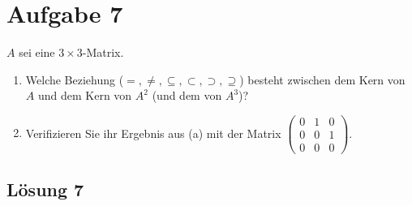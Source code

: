 \documentclass[main.tex]{subfiles}
\begin{document}
\section{Aufgabe 7}
$A$ sei eine $3 \times 3$-Matrix.
\begin{enumerate}
    \item Welche Beziehung ($=,\neq, \subseteq, \subset, \supset, \supseteq$) besteht zwischen dem Kern von $A$ und dem Kern von $A^2$ (und dem von $A^3$)?
    \item Verifizieren Sie ihr Ergebnis aus (a) mit der Matrix $\begin{pmatrix} 
        0 & 1 & 0 \\
        0 & 0 & 1 \\
        0 & 0 & 0
    \end{pmatrix}$.
\end{enumerate}

\subsection{Lösung 7}
\end{document}
